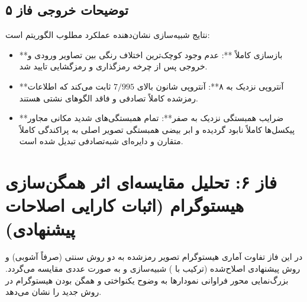 \subsection*{توضیحات خروجی فاز ۵}
نتایج شبیه‌سازی نشان‌دهنده عملکرد مطلوب الگوریتم است:
\begin{itemize}
    \item **بازسازی کاملاً **: عدم وجود کوچک‌ترین اختلاف رنگی بین تصاویر ورودی و خروجی پس از چرخه رمزگذاری و رمزگشایی تایید شد.
    \item **آنتروپی نزدیک به ۸**: آنتروپی شانون بالای $7/995$ ثابت می‌کند که اطلاعات رمزشده کاملاً تصادفی و فاقد الگوهای نشتی هستند.
    \item **ضرایب همبستگی نزدیک به صفر**: تمام همبستگی‌های شدید مکانی مجاور پیکسل‌ها کاملاً نابود گردیده و ابر بیضی همبستگی تصویر اصلی به پراکندگی کاملاً متقارن و دایره‌ای شبه‌تصادفی تبدیل شده است.
\end{itemize}

\section{فاز ۶: تحلیل مقایسه‌ای اثر همگن‌سازی هیستوگرام (اثبات کارایی اصلاحات پیشنهادی)}
در این فاز تفاوت آماری هیستوگرام تصویر رمزشده به دو روش سنتی (صرفاً  آشوبی) و روش پیشنهادی اصلاح‌شده (ترکیب با ) شبیه‌سازی و به صورت عددی مقایسه می‌گردد. بزرگ‌نمایی محور فراوانی نمودارها به وضوح یکنواختی و همگن بودن هیستوگرام در روش جدید را نشان می‌دهد.

